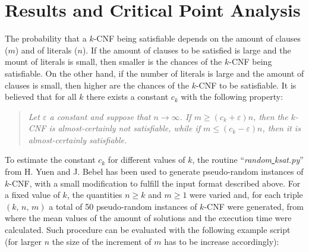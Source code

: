 \documentclass[12pt]{article}
\begin{document}
\linespread{1.5}



\section{Results and Critical Point Analysis}

The probability that a $k$-CNF being satisfiable depends on the amount of clauses ($m$) and of literals ($n$).
If the amount of clauses to be satisfied is large and the mount of literals is small, then smaller is the chances of the $k$-CNF being satisfiable.
On the other hand, if the number of literals is large and the amount of clauses is small, then higher are the chances of the $k$-CNF to be satisfiable.
It is believed that for all $k$ there exists a constant $c_k$ with the following property:

\begin{quote}
  \emph{Let $\varepsilon$ a constant and suppose that $n \to \infty$.
  If $m \geq \left( c_k + \varepsilon \right) n$, then the $k$-CNF is almost-certainly not satisfiable, while if $m \leq \left( c_k - \varepsilon \right) n$, then it is almost-certainly satisfiable.}
\end{quote}

To estimate the constant $c_k$ for different values of $k$, the routine ``\emph{random\underline{ }ksat.py}'' from H. Yuen and J. Bebel has been used to generate pseudo-random instances of $k$-CNF\cite{yuen}, with a small modification to fulfill the input format described above.
For a fixed value of $k$, the quantities $n \geq k$ and $m \geq 1$ were varied and, for each triple $\left( k , \, n , \, m \right)$ a total of 50 pseudo-random instances of $k$-CNF were generated, from where the mean values of the amount of solutions and the execution time were calculated.
Such procedure can be evaluated with the following example script (for larger $n$ the size of the increment of $m$ has to be increase accordingly):

\newpage

\linespread{0.8}
\end{document}
